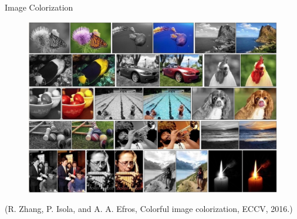 \begin{frame}[allowframebreaks]

\begin{myexampleblock}{8.9}{Image Colorization}
    \begin{figure}[H]
        \centering
        \includegraphics[width=1.0\textwidth]{.././assets/8.10.png}
    \end{figure}

    (R. Zhang, P. Isola, and A. A. Efros, Colorful image colorization, ECCV, 2016.)
\end{myexampleblock}

\end{frame}

